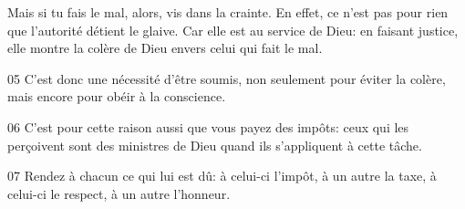 Mais si tu fais le mal, alors, vis dans la crainte. En effet, ce n’est pas pour rien que l’autorité détient le glaive. Car elle est au service de Dieu: en faisant justice, elle montre la colère de Dieu envers celui qui fait le mal.

05 C’est donc une nécessité d’être soumis, non seulement pour éviter la colère, mais encore pour obéir à la conscience.

06 C’est pour cette raison aussi que vous payez des impôts: ceux qui les perçoivent sont des ministres de Dieu quand ils s’appliquent à cette tâche.

07 Rendez à chacun ce qui lui est dû: à celui-ci l’impôt, à un autre la taxe, à celui-ci le respect, à un autre l’honneur.
